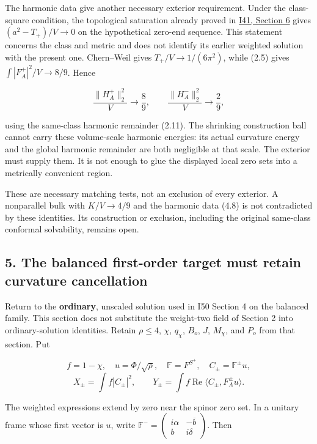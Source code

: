 \documentclass[
  11pt,
]{article}
\begin{document}
The harmonic data give another necessary exterior requirement. Under the
class-square condition, the topological saturation already proved in
\href{20260927_conformal_separation_and_zero_end.md}{I41, Section 6}
gives \((a^2-T_+)/V\to0\) on the hypothetical zero-end sequence. This
statement concerns the class and metric and does not identify its
earlier weighted solution with the present one. Chern--Weil gives
\(T_+/V\to1/(6\pi^2)\), while (2.5) gives \(\int|F_A^+|^2/V\to8/9\).
Hence

\[
 \frac{\|H_A^+\|_2^2}{V}\to\frac89,\qquad
 \frac{\|H_A^-\|_2^2}{V}\to\frac29,
 \tag{4.8}
\]

using the same-class harmonic remainder (2.11). The shrinking
construction ball cannot carry these volume-scale harmonic energies: its
actual curvature energy and the global harmonic remainder are both
negligible at that scale. The exterior must supply them. It is not
enough to glue the displayed local zero sets into a metrically
convenient region.

These are necessary matching tests, not an exclusion of every exterior.
A nonparallel bulk with \(K/V\to4/9\) and the harmonic data (4.8) is not
contradicted by these identities. Its construction or exclusion,
including the original same-class conformal solvability, remains open.

\hypertarget{the-balanced-first-order-target-must-retain-curvature-cancellation}{%
\subsection{5. The balanced first-order target must retain curvature
cancellation}\label{the-balanced-first-order-target-must-retain-curvature-cancellation}}

Return to the \textbf{ordinary}, unscaled solution used in I50 Section 4
on the balanced family. This section does not substitute the weight-two
field of Section 2 into ordinary-solution identities. Retain
\(\rho\le4\), \(\chi\), \(q_\chi\), \(B_o\), \(J\), \(M_\chi\), and
\(P_o\) from that section. Put

\[
 f=1-\chi,\quad u=\Phi/\sqrt\rho,\quad
 \mathbb F=F^{S^+},\quad C_\pm=\mathbb F^\pm u,
\] \[
 X_\pm=\int f|C_\pm|^2,\qquad
 Y_\pm=\int f\operatorname{Re}\langle C_\pm,F_A^\pm u\rangle.
 \tag{5.1}
\]

The weighted expressions extend by zero near the spinor zero set. In a
unitary frame whose first vector is \(u\), write
\(\mathbb F^-=\left(\begin{smallmatrix}i\alpha&-\overline b\\ b&i\delta\end{smallmatrix}\right)\).
Then
\end{document}
